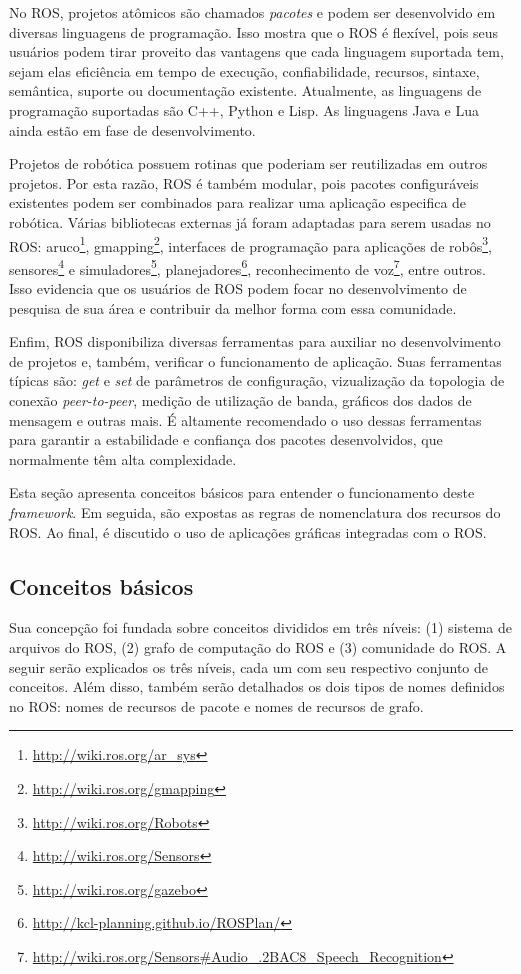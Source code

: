         No ROS, projetos atômicos são chamados \textit{pacotes} e podem ser desenvolvido em diversas linguagens de programação. Isso mostra que o ROS é flexível, pois seus usuários podem tirar proveito das vantagens que cada linguagem suportada tem, sejam elas eficiência em tempo de execução, confiabilidade, recursos, sintaxe, semântica, suporte ou documentação existente. Atualmente, as linguagens de programação suportadas são C++, Python e Lisp. As linguagens Java e Lua ainda estão em fase de desenvolvimento.
        
        Projetos de robótica possuem rotinas que poderiam ser reutilizadas em outros projetos. Por esta razão, ROS é também modular, pois pacotes configuráveis existentes podem ser combinados para realizar uma aplicação especifica de robótica. Várias bibliotecas externas já foram adaptadas para serem usadas no ROS: aruco\footnote{\url{http://wiki.ros.org/ar_sys}}, gmapping\footnote{\url{http://wiki.ros.org/gmapping}}, interfaces de programação para aplicações de robôs\footnote{\url{http://wiki.ros.org/Robots}}, sensores\footnote{\url{http://wiki.ros.org/Sensors}} e simuladores\footnote{\url{http://wiki.ros.org/gazebo}}, planejadores\footnote{\url{http://kcl-planning.github.io/ROSPlan/}}, reconhecimento de voz\footnote{\url{http://wiki.ros.org/Sensors\#Audio_.2BAC8_Speech_Recognition}}, entre outros. Isso evidencia que os usuários de ROS podem focar no desenvolvimento de pesquisa de sua área e contribuir da melhor forma com essa comunidade.
        
        Enfim, ROS disponibiliza diversas ferramentas para auxiliar no desenvolvimento de projetos e, também, verificar o funcionamento de aplicação. Suas ferramentas típicas são: \textit{get} e \textit{set} de parâmetros de configuração, vizualização da topologia de conexão \textit{peer-to-peer}, medição de utilização de banda, gráficos dos dados de mensagem e outras mais. É altamente recomendado o uso dessas ferramentas para garantir a estabilidade e confiança dos pacotes desenvolvidos, que normalmente têm alta complexidade.
        
        Esta seção apresenta conceitos básicos para entender o funcionamento deste \textit{framework}. Em seguida, são expostas as regras de nomenclatura dos recursos do ROS. Ao final, é discutido o uso de aplicações gráficas integradas com o ROS.
        
        \subsection{Conceitos básicos} \label{subsec:ros_conceitos}
            Sua concepção foi fundada sobre conceitos divididos em três níveis: (1) sistema de arquivos do ROS, (2) grafo de computação do ROS e (3) comunidade do ROS. A seguir serão explicados os três níveis, cada um com seu respectivo conjunto de conceitos. Além disso, também serão detalhados os dois tipos de nomes definidos no ROS: nomes de recursos de pacote e nomes de recursos de grafo.
            
